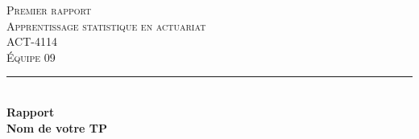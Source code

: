%
%

\begin{titlepage}

\newcommand{\HRule}{\rule{\linewidth}{0.5mm}} %

\center %
\textsc{\LARGE Premier rapport}\\[1.0cm] %
\textsc{\Large Apprentissage statistique en actuariat}\\[0.2cm] %
\textsc{\large ACT-4114}\\[0.7cm] %
\textsc{\large Équipe 09}\\[0.7cm] %


\HRule \\[0.4cm]
{ \Large \bfseries Rapport}\\[0.20cm] { \huge \bfseries Nom de votre TP}\\[0.20cm]


\end{titlepage}
